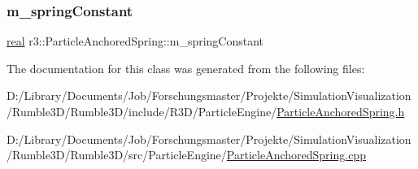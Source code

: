 \mbox{\label{classr3_1_1_particle_anchored_spring_a0c220ca894297faeb2ea7b97dea9c27e}} 
\subsubsection{\texorpdfstring{m\+\_\+spring\+Constant}{m\_springConstant}}
{\footnotesize\ttfamily \mbox{\hyperlink{namespacer3_ab2016b3e3f743fb735afce242f0dc1eb}{real}} r3\+::\+Particle\+Anchored\+Spring\+::m\+\_\+spring\+Constant\hspace{0.3cm}{\ttfamily [protected]}}



The documentation for this class was generated from the following files\+:\begin{DoxyCompactItemize}
\item 
D\+:/\+Library/\+Documents/\+Job/\+Forschungsmaster/\+Projekte/\+Simulation\+Visualization/\+Rumble3\+D/\+Rumble3\+D/include/\+R3\+D/\+Particle\+Engine/\mbox{\hyperlink{_particle_anchored_spring_8h}{Particle\+Anchored\+Spring.\+h}}\item 
D\+:/\+Library/\+Documents/\+Job/\+Forschungsmaster/\+Projekte/\+Simulation\+Visualization/\+Rumble3\+D/\+Rumble3\+D/src/\+Particle\+Engine/\mbox{\hyperlink{_particle_anchored_spring_8cpp}{Particle\+Anchored\+Spring.\+cpp}}\end{DoxyCompactItemize}
